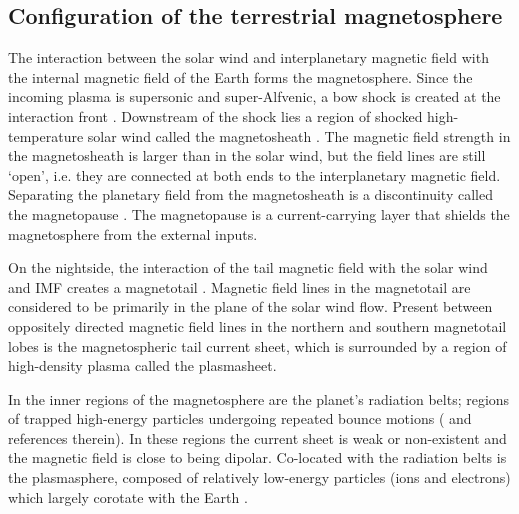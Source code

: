 \subsection{Configuration of the terrestrial magnetosphere}
The interaction between the solar wind and interplanetary magnetic field with the internal magnetic field of the Earth forms the magnetosphere. Since the incoming plasma is supersonic and super-Alfvenic, a bow shock is created at the interaction front \cite{Spreiter1966HydromagneticMagnetosphere}. Downstream of the shock lies a region of shocked high-temperature solar wind called the magnetosheath \cite{Lucek2005TheMagnetosheath}. The magnetic field strength in the magnetosheath is larger than in the solar wind, but the field lines are still `open', i.e. they are connected at both ends to the interplanetary magnetic field. Separating the planetary field from the magnetosheath is a discontinuity called the magnetopause \cite{Russell1978InitialObservations,Sonnerup1967MagnetopauseObservations}. The magnetopause is a current-carrying layer that shields the magnetosphere from the external inputs.

On the nightside, the interaction of the tail magnetic field with the solar wind and IMF creates a magnetotail \cite{Hones1984StructureActivity}. Magnetic field lines in the magnetotail are considered to be primarily in the plane of the solar wind flow. Present between oppositely directed magnetic field lines in the northern and southern magnetotail lobes is the magnetospheric tail current sheet, which is surrounded by a region of high-density plasma called the plasmasheet. 

In the inner regions of the magnetosphere are the planet's radiation belts; regions of trapped high-energy particles undergoing repeated bounce motions ( and references therein). In these regions the current sheet is weak or non-existent and the magnetic field is close to being dipolar. Co-located with the radiation belts is the plasmasphere, composed of relatively low-energy particles (ions and electrons) which largely corotate with the Earth \cite{Lemaire1998ThePlasmasphere}.

